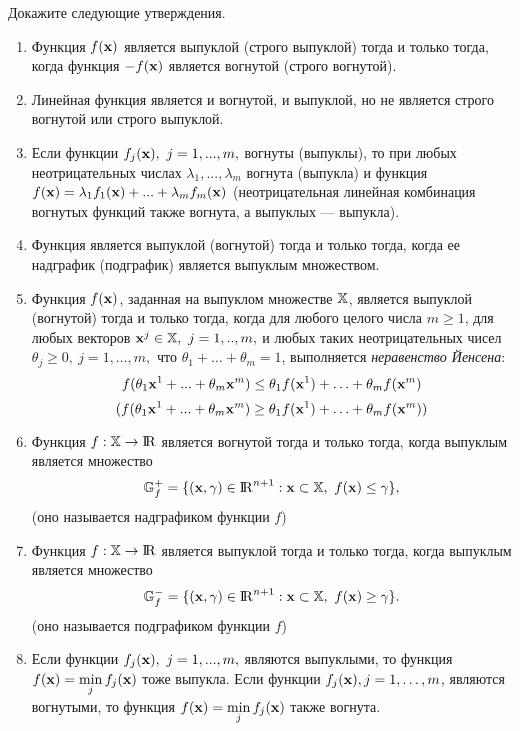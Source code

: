 \begin{exer}
Докажите следующие утверждения.


\begin{enumerate}
\renewcommand{\theenumi}{(\roman{enumi})}

  \item Функция $f(\mathbf{x})$ является выпуклой
(строго выпуклой) тогда и только тогда, когда функция $-f(\mathbf{x})$
является вогнутой (строго вогнутой).

  \item Линейная функция является и вогнутой, и выпуклой, но не является строго вогнутой или
  строго выпуклой.

  \item
  Если функции $f_{j}(\vc{x}), \ j=1,...,m,$ вогнуты (выпуклы), то
  при любых неотрицательных числах $\lambda_{1},...,\lambda_{m}$
  вогнута (выпукла) и функция
  $f(\mathbf{x})=\lambda_{1}f_{1}(\mathbf{x})+...+\lambda_{m}f_{m}(\mathbf{x})$
  (неотрицательная линейная комбинация вогнутых функций также
  вогнута, а выпуклых --- выпукла).


  \item Функция является выпуклой (вогнутой) тогда и только тогда,
  когда ее надграфик (подграфик) является выпуклым множеством.

  \item Функция $f(\mathbf{x})$, заданная на выпуклом множестве $\mathbb{X}$,
  является выпуклой (вогнутой) тогда и только тогда,
  когда для любого целого числа $m \geq 1$, для любых векторов
  $\vc{x}^j \in \st{X}, \ j=1,..,m,$ и любых таких неотрицательных чисел
  $\theta_j \geq 0, \ j=1,\ldots,m,$ что
  $\theta_{1}+...+\theta_{m}=1$, выполняется \emph{неравенство Йенсена}:
  \[
    f(\theta_1 \mathbf{x}^1 +...+\theta_m
    \mathbf{x}^m) \leq \theta_1 f(\mathbf{x}^1)+\ldots +\theta_m
    f(\mathbf{x}^m)
  \]
  \[
    (f(\theta_1 \mathbf{x}^1 +...+\theta_m
    \mathbf{x}^m) \geq \theta_1 f(\mathbf{x}^1) + \ldots +\theta_m
    f(\mathbf{x}^m))
  \]

    \item Функция $f:\mathbb{X}\rightarrow {\rm I\!R}$ является вогнутой тогда и только тогда, когда
    выпуклым является множество
\[
    \mathbb{G}_{f}^+=\{ (\mathbf{x}, \gamma) \in {\rm I\!R}^{n+1}: \mathbf{x}\subset\mathbb{X}, \
    f(\mathbf{x}) \leq \gamma \},
\]
    (оно называется надграфиком функции $f$)

    \item Функция $f:\mathbb{X}\rightarrow {\rm I\!R}$ является выпуклой тогда и только тогда, когда
    выпуклым является множество
\[
    \mathbb{G}_{f}^- =\{ (\mathbf{x}, \gamma) \in {\rm I\!R}^{n+1}: \mathbf{x}\subset\mathbb{X}, \
    f(\mathbf{x}) \geq \gamma \}.
\]
    (оно называется подграфиком функции $f$)

  \item Если функции $f_{j}(\vc{x}), \ j=1,...,m,$ являются
  выпуклыми, то функция
  $f(\mathbf{x})=\min\limits_{j}f_{j}(\mathbf{x})$
  тоже выпукла.
  Если функции $f_j (\mathbf{x}), j=1, \ldots, m$, являются
  вогнутыми, то функция
  $f(\mathbf{x}) = \mathop {\min }\limits_j f_j(\mathbf{x})$ также вогнута.

\end{enumerate}

\end{exer}


